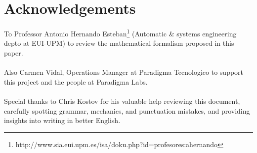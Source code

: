 \newpage

\section{Acknowledgements}

To Professor Antonio Hernando Esteban\footnote{http://www.sia.eui.upm.es/isa/doku.php?id=profesores:ahernando}  (Automatic \& systems engineering depto at EUI-UPM) to review the mathematical formalism proposed in this paper.
\\
\\
Also Carmen Vidal, Operations Manager at Paradigma Tecnologico to support this project and the people at Paradigma Labs.
\\
\\
Special thanks to Chris Kostov for his valuable help reviewing this document, carefully spotting grammar, mechanics, and punctuation mistakes, and providing insights into writing in better English.
